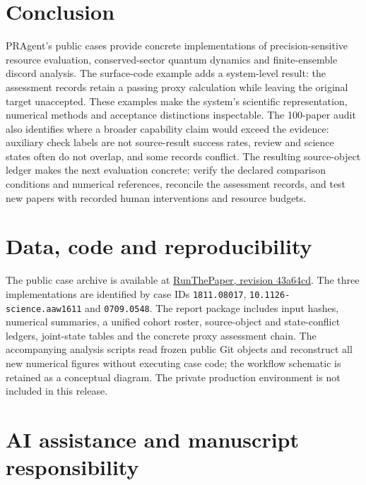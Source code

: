 \documentclass[10pt,a4paper]{article}
\begin{document}
\section{Conclusion}\label{conclusion}

PRAgent's public cases provide concrete implementations of
precision-sensitive resource evaluation, conserved-sector quantum
dynamics and finite-ensemble discord analysis. The surface-code example
adds a system-level result: the assessment records retain a passing
proxy calculation while leaving the original target unaccepted. These
examples make the system's scientific representation, numerical methods
and acceptance distinctions inspectable. The 100-paper audit also
identifies where a broader capability claim would exceed the evidence:
auxiliary check labels are not source-result success rates, review and
science states often do not overlap, and some records conflict. The
resulting source-object ledger makes the next evaluation concrete:
verify the declared comparison conditions and numerical references,
reconcile the assessment records, and test new papers with recorded
human interventions and resource budgets.

\section*{Data, code and
reproducibility}\label{data-code-and-reproducibility}

The public case archive is available at
\href{https://github.com/xi-zhao/RunThePaper/tree/43a64cd03824edb136b549f352412e8d263d9361}{RunThePaper,
revision 43a64cd}. The three implementations are identified by case IDs
\texttt{1811.08017}, \texttt{10.1126-science.aaw1611} and
\texttt{0709.0548}. The report package includes input hashes, numerical
summaries, a unified cohort roster, source-object and state-conflict
ledgers, joint-state tables and the concrete proxy assessment chain. The
accompanying analysis scripts read frozen public Git objects and
reconstruct all new numerical figures without executing case code; the
workflow schematic is retained as a conceptual diagram. The private
production environment is not included in this release.

\section*{AI assistance and manuscript
responsibility}\label{ai-assistance-and-manuscript-responsibility}
\end{document}
